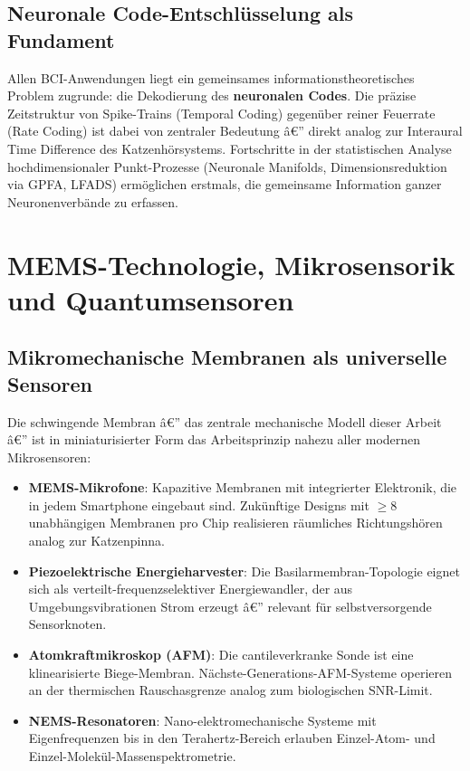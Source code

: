 ﻿\documentclass[12pt,a4paper,titlepage]{report}
\begin{document}
\subsection{Neuronale Code-Entschlüsselung als Fundament}

Allen BCI-Anwendungen liegt ein gemeinsames informationstheoretisches Problem
zugrunde: die Dekodierung des \textbf{neuronalen Codes}. Die präzise Zeitstruktur
von Spike-Trains (Temporal Coding) gegenüber reiner Feuerrate (Rate Coding) ist
dabei von zentraler Bedeutung â€” direkt analog zur Interaural Time Difference
des Katzenhörsystems. Fortschritte in der statistischen Analyse hochdimensionaler
Punkt-Prozesse (Neuronale Manifolds,
Dimensionsreduktion via GPFA, LFADS) ermöglichen erstmals, die gemeinsame Information
ganzer Neuronenverbände zu erfassen.

\section{MEMS-Technologie, Mikrosensorik und Quantumsensoren}

\subsection{Mikromechanische Membranen als universelle Sensoren}

Die schwingende Membran â€” das zentrale mechanische Modell dieser Arbeit â€” ist in
miniaturisierter Form das Arbeitsprinzip nahezu aller modernen Mikrosensoren:
\begin{itemize}[leftmargin=2em]
    \item \textbf{MEMS-Mikrofone}: Kapazitive Membranen mit integrierter
        Elektronik, die in jedem Smartphone eingebaut sind. Zukünftige Designs
        mit $\geq 8$ unabhängigen Membranen pro Chip realisieren räumliches
        Richtungshören analog zur Katzenpinna.
    \item \textbf{Piezoelektrische Energieharvester}: Die Basilarmembran-Topologie
        eignet sich als verteilt-frequenzselektiver Energiewandler, der aus
        Umgebungsvibrationen Strom erzeugt â€” relevant für selbstversorgende
        Sensorknoten.
    \item \textbf{Atomkraftmikroskop (AFM)}: Die cantileverkranke Sonde ist eine
        klinearisierte Biege-Membran. Nächste-Generations-AFM-Systeme operieren
        an der thermischen Rauschasgrenze analog zum biologischen SNR-Limit.
    \item \textbf{NEMS-Resonatoren}: Nano-elektromechanische Systeme mit
        Eigenfrequenzen bis in den Terahertz-Bereich erlauben Einzel-Atom-
        und Einzel-Molekül-Massenspektro\-metrie.
\end{itemize}
\end{document}

